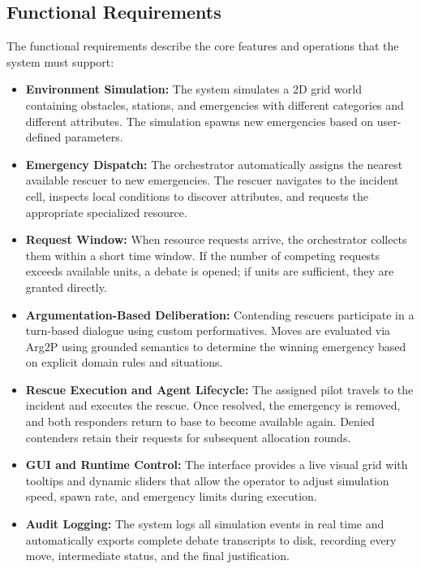 \subsection{Functional Requirements}
\label{subsec:functional_requirements}

The functional requirements describe the core features and operations that the system must support:

\begin{itemize}
    \item \textbf{Environment Simulation:} The system simulates a 2D grid world containing obstacles, stations, and emergencies with different categories and different attributes. The simulation spawns new emergencies based on user-defined parameters.
    
    \item \textbf{Emergency Dispatch:} The orchestrator automatically assigns the nearest available rescuer to new emergencies. The rescuer navigates to the incident cell, inspects local conditions to discover attributes, and requests the appropriate specialized resource.
    
    \item \textbf{Request Window:} When resource requests arrive, the orchestrator collects them within a short time window. If the number of competing requests exceeds available units, a debate is opened; if units are sufficient, they are granted directly.
    
    \item \textbf{Argumentation-Based Deliberation:} Contending rescuers participate in a turn-based dialogue using custom performatives. Moves are evaluated via Arg2P using grounded semantics to determine the winning emergency based on explicit domain rules and situations.
    
    \item \textbf{Rescue Execution and Agent Lifecycle:} The assigned pilot travels to the incident and executes the rescue. Once resolved, the emergency is removed, and both responders return to base to become available again. Denied contenders retain their requests for subsequent allocation rounds.
    
    \item \textbf{GUI and Runtime Control:} The interface provides a live visual grid with tooltips and dynamic sliders that allow the operator to adjust simulation speed, spawn rate, and emergency limits during execution.
    
    \item \textbf{Audit Logging:} The system logs all simulation events in real time and automatically exports complete debate transcripts to disk, recording every move, intermediate status, and the final justification.
\end{itemize}

